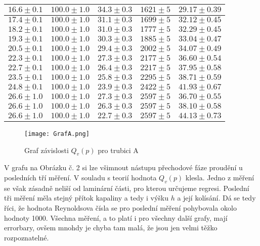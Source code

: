 \documentclass[a4paper]{article}
\begin{document}
\begin{center}
\begin{tabular}{ | c | c | c | c |  p{3cm} |}
    $16.6\pm0.1$ & $100.0\pm1.0$ & $34.3\pm0.3$ & $1621\pm5$ & $29.17\pm0.39$ \\ \hline
    $17.4\pm0.1$ & $100.0\pm1.0$ & $31.1\pm0.3$ & $1699\pm5$ & $32.12\pm0.45$ \\ \hline
    $18.2\pm0.1$ & $100.0\pm1.0$ & $31.0\pm0.3$ & $1777\pm5$ & $32.29\pm0.45$ \\ \hline
    $19.3\pm0.1$ & $100.0\pm1.0$ & $30.3\pm0.3$ & $1885\pm5$ & $33.04\pm0.47$ \\ \hline
    $20.5\pm0.1$ & $100.0\pm1.0$ & $29.4\pm0.3$ & $2002\pm5$ & $34.07\pm0.49$ \\ \hline
    $22.3\pm0.1$ & $100.0\pm1.0$ & $27.3\pm0.3$ & $2177\pm5$ & $36.60\pm0.54$ \\ \hline
    $22.7\pm0.1$ & $100.0\pm1.0$ & $26.4\pm0.3$ & $2217\pm5$ & $37.95\pm0.58$ \\ \hline
    $23.5\pm0.1$ & $100.0\pm1.0$ & $25.8\pm0.3$ & $2295\pm5$ & $38.71\pm0.59$ \\ \hline
    $24.8\pm0.1$ & $100.0\pm1.0$ & $23.9\pm0.3$ & $2422\pm5$ & $41.93\pm0.67$ \\ \hline
    $26.6\pm1.0$ & $100.0\pm1.0$ & $27.3\pm0.3$ & $2597\pm5$ & $36.70\pm0.55$ \\ \hline
    $26.6\pm1.0$ & $100.0\pm1.0$ & $26.3\pm0.3$ & $2597\pm5$ & $38.10\pm0.58$ \\ \hline
    $26.6\pm1.0$ & $100.0\pm1.0$ & $22.7\pm0.3$ & $2597\pm5$ & $44.13\pm0.73$ \\ \hline
    \end{tabular}
\end{center}
\begin{figure}[H]
\centering
\texttt{[image: GrafA.png]}
\caption{Graf závislosti $Q_{v}(p)$ pro trubici A}
\end{figure}
\par V grafu na Obrázku č. 2 si lze všimnout nástupu přechodové fáze proudění u posledních tří měření. V souladu s teorií hodnota $Q_{v}(p)$ klesla. Jedno z měření se však zásadně neliší od laminární části, pro kterou určujeme regresi. Poslední tři měření měla stejný přítok kapaliny a tedy i výšku $h$ a její kolísání. Dá se tedy říci, že hodnota Reynoldsova čísla se pro poslední měření pohybovala okolo hodnoty 1000. Všechna měření, a to platí i pro všechny další grafy, mají errorbary, ovšem mnohdy je chyba tam malá, že jsou jen velmi těžko rozpoznatelné.
\end{document}
